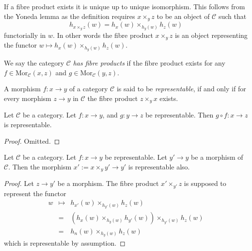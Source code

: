 \noindent
If a fibre product exists it is unique up to unique
isomorphism. This follows from the Yoneda lemma as
the definition requires $x\times_yz$ to be an object
of $\mathcal{C}$ such that
$$
h_{x\times_y z}(w) = h_x(w) \times_{h_y(w)} h_z(w)
$$
functorially in $w$. In other words the fibre product $x\times_yz$
is an object representing the functor
$w \mapsto h_x(w) \times_{h_y(w)} h_z(w)$.

\begin{definition}
\label{definition-has-fibre-products}
We say the category $\mathcal{C}$ {\it has fibre products} if
the fibre product exists for any $f\in \text{Mor}_{\mathcal C}(x, z)$
and $g\in \text{Mor}_{\mathcal C}(y, z)$.
\end{definition}

\begin{definition}
\label{definition-representable-morphism}
A morphism $f : x \to y$ of a category $\mathcal{C}$ is said to be
{\it representable}, if and only if for every morphism $z \to y$
in $\mathcal{C}$ the fibre product $z\times_y x$ exists.
\end{definition}

\begin{lemma}
\label{lemma-composition-representable}
Let $\mathcal{C}$ be a category.
Let $f : x \to y$, and $g : y \to z$ be representable.
Then $g \circ f : x \to z$ is representable.
\end{lemma}

\begin{proof}
Omitted.
\end{proof}

\begin{lemma}
\label{lemma-base-change-representable}
Let $\mathcal{C}$ be a category.
Let $f : x \to y$ be representable.
Let $y' \to y$ be a morphism of $\mathcal{C}$.
Then the morphism $x' := x \times_y y' \to y'$ is representable also.
\end{lemma}

\begin{proof}
Let $z \to y'$ be a morphism. The fibre product
$x' \times_{y'} z$ is supposed to represent the
functor
\begin{eqnarray*}
w & \mapsto & h_{x'}(w)\times_{h_{y'}(w)} h_z(w) \\
& = & (h_x(w) \times_{h_y(w)} h_{y'}(w)) \times_{h_{y'}(w)} h_z(w) \\
& = & h_n(w) \times_{h_y(w)} h_z(w)
\end{eqnarray*}
which is representable by assumption.
\end{proof}

